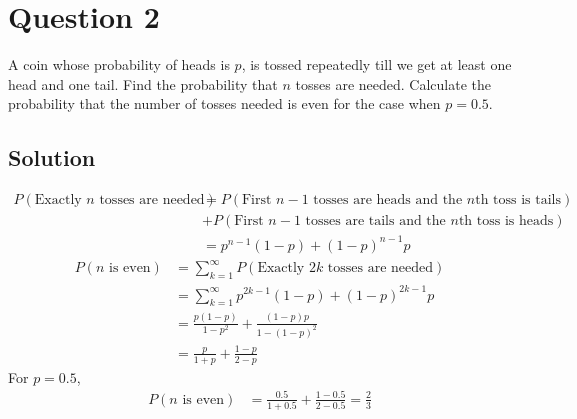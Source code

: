 \section*{Question 2}

A coin whose probability of heads is \(p\), is tossed repeatedly till we get at least one head and one tail.
Find the probability that \(n\) tosses are needed.
Calculate the probability that the number of tosses needed is even for the case when \(p = 0.5\).

\subsection*{Solution}

\begin{align*}
    P(\text{Exactly \(n\) tosses are needed})
     & = P(\text{First \(n-1\) tosses are heads and the \(n\)th toss is tails})
    \\ & +
    P(\text{First \(n-1\) tosses are tails and the \(n\)th toss is heads})
    \\ & =
    \boxed{
    p^{n-1} (1-p) + {(1-p)}^{n-1} p
    }
\end{align*}
\begin{align*}
    P(\text{\(n\) is even})
     & =
    \sum_{k=1}^{\infty} P(\text{Exactly \(2k\) tosses are needed})
    \\ & =
    \sum_{k=1}^{\infty} p^{2k-1} (1-p) + {(1-p)}^{2k-1} p
    \\ & =
    \frac{p(1-p)}{1 - p^2} + \frac{(1-p)p}{1 - {(1-p)}^2}
    \\ & =
    \frac{p}{1 + p} + \frac{1-p}{2 - p}
\end{align*}
For \(p = 0.5\),
\begin{align*}
    P(\text{\(n\) is even})
     & =
    \frac{0.5}{1 + 0.5} + \frac{1-0.5}{2 - 0.5}
    = \boxed{\frac{2}{3}}
\end{align*}
